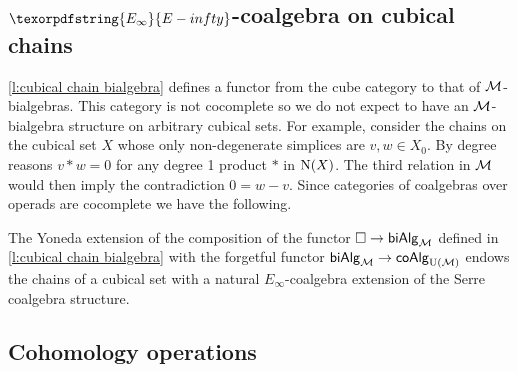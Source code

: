 \subsection{$\texorpdfstring{E_\infty}{E-infty}$-coalgebra on cubical chains}

\cref{l:cubical chain bialgebra} defines a functor from the cube category to that of $\mathcal{M}$-bialgebras.
This category is not cocomplete so we do not expect to have an $\mathcal{M}$-bialgebra structure on arbitrary cubical sets.
For example, consider the chains on the cubical set $X$ whose only non-degenerate simplices are $v, w \in X_0$.
By degree reasons $v \ast w = 0$ for any degree 1 product $\ast$ in $\operatorname{N}(X)$.
The third relation in $\mathcal{M}$ would then imply the contradiction $0 = w-v$.
Since categories of coalgebras over operads are cocomplete we have the following.

\begin{theorem} \label{t:lift to e infinity coalgebras}
	The Yoneda extension of the composition of the functor $\square \to \mathsf{biAlg}_{\mathcal{M}}$ defined in \cref{l:cubical chain bialgebra} with the forgetful functor $\mathsf{biAlg}_{\mathcal{M}} \to \mathsf{coAlg}_{{\operatorname{U}(\mathcal{M})}}$ endows the chains of a cubical set with a natural $E_\infty$-coalgebra extension of the Serre coalgebra structure.
\end{theorem}


\subsection{Cohomology operations}

